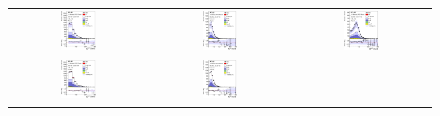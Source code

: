 \begin{figure}[tp]
  \centering
  \begin{tabular}{ccc}
  \includegraphics[width=0.27\textwidth]{Analysis/Figures_ttH/tesis_vars/prefit/lep_pt_6jetin3btagex.eps} &
  \includegraphics[width=0.27\textwidth]{Analysis/Figures_ttH/tesis_vars/prefit/met_6jetin3btagex.eps} &
  \includegraphics[width=0.27\textwidth]{Analysis/Figures_ttH/tesis_vars/prefit/WlepMT_6jetin3btagex.eps} \\
  \includegraphics[width=0.27\textwidth]{Analysis/Figures_ttH/tesis_vars/postfit/lep_pt_6jetin3btagex.eps} &
  \includegraphics[width=0.27\textwidth]{Analysis/Figures_ttH/tesis_vars/postfit/met_6jetin3btagex.eps} &

\end{tabular}
\end{figure}
